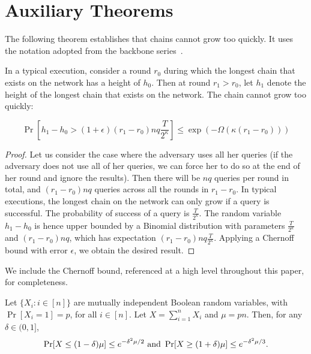 \section{Auxiliary Theorems}

The following theorem establishes that chains cannot grow too quickly. It uses the
notation adopted from the backbone series~\cite{backbone,varbackbone}.

\begin{theorem}
  In a typical execution,
consider a round $r_0$ during which the longest chain that exists on the network has
a height of $h_0$. Then at round $r_1 > r_0$, let $h_1$ denote the height of the longest
chain that exists on the network. The chain cannot grow too quickly:

\[
  \Pr[h_1 - h_0 > (1 + \epsilon) (r_1 - r_0)nq \frac{T}{2^\kappa}] \leq \exp(-\Omega(\kappa (r_1 - r_0)))
\]
\end{theorem}
\begin{proof}
  Let us consider the case where the adversary uses all her queries (if the adversary does not use
  all of her queries, we can force her to do so at the end of her round and ignore the results).
  Then there will be $nq$ queries per round in total, and $(r_1 - r_0)nq$ queries across all the rounds
  in $r_1 - r_0$. In typical executions, the longest chain on the network can only grow if a query is successful.
  The probability of success of a query is $\frac{T}{2^\kappa}$. The random variable $h_1 - h_0$ is
  hence upper bounded by a Binomial distribution with parameters $\frac{T}{2^\kappa}$ and $(r_1 - r_0)nq$,
  which has expectation $(r_1 - r_0)nq \frac{T}{2^\kappa}$. Applying a Chernoff bound with error $\epsilon$,
  we obtain the desired result.
\end{proof}

We include the Chernoff bound, referenced at a high level throughout this paper, for completeness.

\begin{theorem}
  Let $\{X_i:i\in[n]\}$ are mutually independent Boolean random variables,
  with $\Pr[X_i=1]=p$, for all $i\in[n]$. Let $X=\sum_{i=1}^nX_i$ and $\mu=pn$.
  Then, for any $\delta\in(0,1]$,
  \[\Pr[X\le(1-\delta)\mu]\le e^{-\delta^2\mu/2}\hbox{~and~}
    \Pr[X\ge(1+\delta)\mu]\le e^{-\delta^2\mu/3}.\]
\end{theorem}
